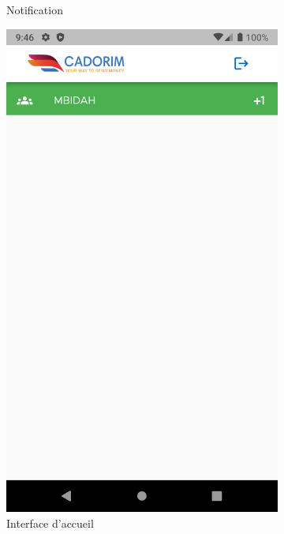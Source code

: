 \begin{itemize}[label=$\ast$]
\begin{figure}
\begin{subfigure}{0.3\textwidth}
		\caption{Notification}
		\label{klk}
	\end{subfigure}
	\begin{subfigure}{0.3\textwidth}
		\includegraphics[width=\hsize, valign=m ]{./Template LaTeX/Images/From_emu/no_vue.png}
		\caption{Interface d’accueil}
		\label{klk}
	\end{subfigure}
	\begin{subfigure}{0.3\textwidth}

\end{subfigure}
\end{figure}
\end{itemize}
